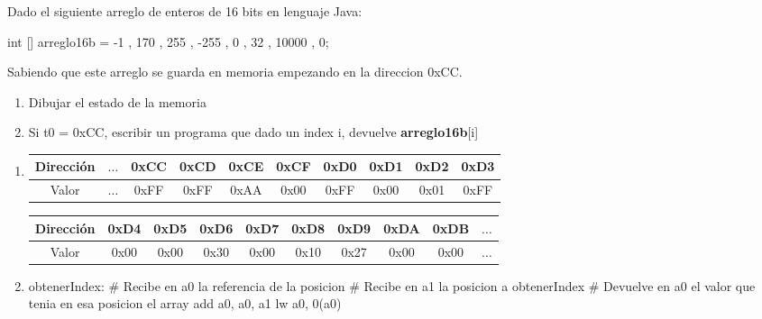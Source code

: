 \begin{enunciado}{\ejercicio}
    Dado el siguiente arreglo de enteros de 16 bits en lenguaje Java:

    \begin{java}
        int [] arreglo16b = { -1 , 170 , 255 , -255 , 0 , 32 , 10000 , 0};
    \end{java}

    Sabiendo que este arreglo se guarda en memoria empezando en la direccion 0xCC.

    \begin{enumerate}
        \item Dibujar el estado de la memoria
        \item Si t0 = 0xCC, escribir un programa que dado un index i, devuelve \textbf{arreglo16b}[i]
    \end{enumerate}
    \end{enunciado}

\begin{enumerate}
\item
    \begin{center}
    \begin{tabular}{ |c|c|c|c|c|c|c|c|c|c|} 
        \hline
        Dirección & $\dots$ & 0xCC & 0xCD & 0xCE & 0xCF & 0xD0 & 0xD1 & 0xD2 & 0xD3   \\
        \hline       %
        Valor     & $\dots$ & 0xFF & 0xFF & 0xAA & 0x00 & 0xFF & 0x00 & 0x01 & 0xFF   \\
        \hline
        
    \end{tabular}
    \end{center}

    \begin{center}
        \begin{tabular}{ |c|c|c|c|c|c|c|c|c|c|} 
            \hline
            Dirección & 0xD4 & 0xD5 & 0xD6 & 0xD7 & 0xD8 & 0xD9 & 0xDA & 0xDB & $\dots$ \\
            \hline
            Valor     & 0x00 & 0x00 & 0x30 & 0x00 & 0x10 & 0x27 & 0x00 & 0x00 &$\dots$ \\
            \hline
        \end{tabular}
    \end{center}

\item
    \begin{riscv}
        obtenerIndex:
        # Recibe en a0 la referencia de la posicion
        # Recibe en a1 la posicion a obtenerIndex
        # Devuelve en a0 el valor que tenia en esa posicion el array
        add a0, a0, a1
        lw a0, 0(a0)
    \end{riscv}
\end{enumerate}

    

    